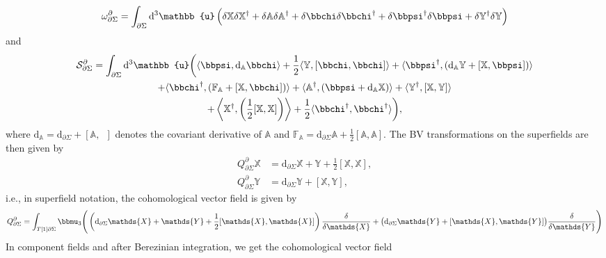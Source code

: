 \documentclass[11pt,colorinlistoftodos]{amsart}
\numberwithin{equation}{subsection}
\theoremstyle{plain}
\theoremstyle{definition}
\theoremstyle{remark}
\newcommand{\dd}{{\mathrm{d}}}
\newcommand{\de}{\partial}
\newcommand{\calS}{\mathcal{S}}
\begin{document}
\begin{equation}
\omega^\de_{\de\Sigma}=\int_{\de\Sigma}\dd^3\mathbb{u} \left(\delta \mathbb{X} \delta \mathbb{X}^\dagger+\delta \mathbb{A}\delta \mathbb{A}^\dagger+\delta\bbchi\delta\bbchi^\dagger+\delta\bbpsi^\dagger\delta\bbpsi+\delta \mathbb{Y}^\dagger\delta \mathbb{Y}\right)
\end{equation}
and
\begin{multline}
\calS^\de_{\de\Sigma}= \int_{\de\Sigma}\dd^3\mathbb{u}\bigg(\langle \bbpsi,\dd_\mathbb{A}\bbchi\rangle+\frac{1}{2}\langle \mathbb{Y},[\bbchi,\bbchi]\rangle+\langle \bbpsi^\dagger,(\dd_\mathbb{A} \mathbb{Y}+[\mathbb{X},\bbpsi])\rangle\\+\langle \bbchi^\dagger,(\mathbb{F}_\mathbb{A}+[\mathbb{X},\bbchi])\rangle+\langle \mathbb{A}^\dagger,(\bbpsi+\dd_\mathbb{A}\mathbb{X})\rangle+\langle \mathbb{Y}^\dagger,[\mathbb{X},\mathbb{Y}]\rangle\\+\left\langle \mathbb{X}^\dagger,\left(\frac{1}{2}[\mathbb{X},\mathbb{X}]\right)\right\rangle+\frac{1}{2}\langle \bbchi^\dagger,\bbchi^\dagger\rangle\bigg),
\end{multline}
where $\dd_\mathbb{A}=\dd_{\de\Sigma}+[\mathbb{A},\enspace]$ denotes the covariant derivative of $\mathbb{A}$ and $\mathbb{F}_\mathbb{A}=\dd_{\de\Sigma} \mathbb{A}+\frac{1}{2}[\mathbb{A},\mathbb{A}]$. The BV transformations on the superfields are then given by 
\begin{align}
    Q^\de_{\de\Sigma} \mathds{X}&=\dd_{\de\Sigma}\mathds{X}+\mathds{Y}+\frac{1}{2}[\mathds{X},\mathds{X}],\\
    Q^\de_{\de\Sigma}\mathds{Y}&=\dd_{\de\Sigma}\mathds{Y}+[\mathds{X},\mathds{Y}],
\end{align}
i.e., in superfield notation, the cohomological vector field is given by 
\begin{equation}
    Q^\de_{\de\Sigma}=\int_{T[1]\de\Sigma}\bbmu_3\Bigg(\left(\dd_{\de\Sigma}\mathds{X}+\mathds{Y}+\frac{1}{2}[\mathds{X},\mathds{X}]\right)\frac{\delta}{\delta\mathds{X}}+\big(\dd_{\de\Sigma}\mathds{Y}+[\mathds{X},\mathds{Y}]\big)\frac{\delta}{\delta\mathds{Y}}\Bigg)
\end{equation}
In component fields and after Berezinian integration, we get the cohomological vector field
\end{document}

